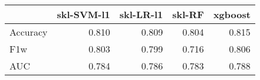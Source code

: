 \begin{tabular}{lrrrr}
\toprule
{} &  skl-SVM-l1 &  skl-LR-l1 &  skl-RF &  xgboost \\
\midrule
Accuracy &       0.810 &      0.809 &   0.804 &    0.815 \\
F1w      &       0.803 &      0.799 &   0.716 &    0.806 \\
AUC      &       0.784 &      0.786 &   0.783 &    0.788 \\
\bottomrule
\end{tabular}
